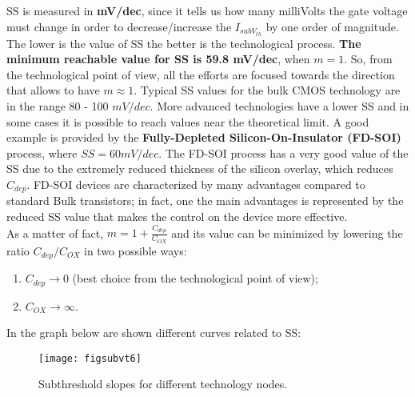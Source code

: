 \documentclass[a4paper, 12pt, twoside, openright]{report}
\begin{document}
SS is measured in \textbf{mV/dec}, since it tells us how many milliVolts the gate voltage must change in order to decrease/increase the $I_{subV_{th}}$ by one order of magnitude. The lower is the value of SS the better is the technological process. \textbf{The minimum reachable value for SS is 59.8 mV/dec}, when $m = 1$. So, from the technological point of view, all the efforts are focused towards the direction that allows to have $m \approx 1$. Typical SS values for the bulk CMOS technology are in the range 80 - 100 $mV/dec$. More advanced technologies have a lower SS and in some cases it is possible to reach values near the theoretical limit. A good example is provided by the \textbf{Fully-Depleted Silicon-On-Insulator (FD-SOI)} process, where $SS=60mV/dec$. The FD-SOI process has a very good value of the SS due to the extremely reduced thickness of the silicon overlay, which reduces $C_{dep}$. FD-SOI devices are characterized by many advantages compared to standard Bulk transistors; in fact, one the main advantages is represented by the reduced SS value that makes the control on the device more effective.\\
As a matter of fact, $m = 1+ \frac{C_{dep}}{C_{OX}}$ and its value can be minimized by lowering the ratio $C_{dep}/C_{OX}$ in two possible ways:

\begin{enumerate}
\item $C_{dep} \rightarrow 0$ (best choice from the technological point of view);
\item $C_{OX} \rightarrow \infty$.
\end{enumerate}

In the graph below are shown different curves related to SS: 

	\begin{figure}[H]
	\centering
	\texttt{[image: figsubvt6]}
	\caption{Subthreshold slopes for different technology nodes.}
	\label{}
	\end{figure}
\end{document}

